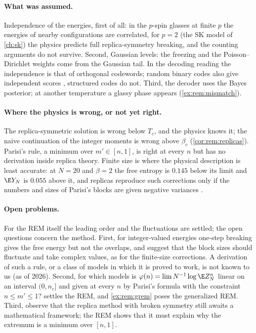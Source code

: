 \begin{refsection}
\paragraph{What was assumed.} Independence of the energies, first of all: in the $p$-spin glasses at finite $p$ the energies of nearby configurations are correlated, for $p=2$ (the SK model of \cref{ch:sk}) the physics predicts full replica-symmetry breaking, and the counting arguments do not survive. Second, Gaussian levels: the freezing and the Poisson--Dirichlet weights come from the Gaussian tail. In the decoding reading the independence is that of orthogonal codewords; random binary codes also give independent scores \parencite[ch.~6]{MezardMontanari2009}, structured codes do not. Third, the decoder uses the Bayes posterior; at another temperature a glassy phase appears (\cref{ex:rem:mismatch}).

\paragraph{Where the physics is wrong, or not yet right.} The replica-symmetric solution is wrong below $T_c$, and the physics knows it; the naive continuation of the integer moments is wrong above $\beta_c$ (\cref{cor:rem:replicas}). Parisi's rule, a minimum over $m'\in[n,1]$, is right at every $n$ but has no derivation inside replica theory. Finite size is where the physical description is least accurate: at $N=20$ and $\beta=2$ the free entropy is $0.145$ below its limit and $\E Y_N$ is $0.055$ above it, and replicas reproduce such corrections only if the numbers and sizes of Parisi's blocks are given negative variances \parencite{DerridaMottishaw2015}.

\paragraph{Open problems.} For the REM itself the leading order and the fluctuations are settled; the open questions concern the method. First, for integer-valued energies one-step breaking gives the free energy but not the overlaps, and \textcite{DerridaMottishaw2022} suggest that the block sizes should fluctuate and take complex values, as for the finite-size corrections. A derivation of such a rule, or a class of models in which it is proved to work, is not known to us (as of 2026). Second, for which models is $\varphi(n)=\lim N^{-1}\log\E Z_N^n$ linear on an interval $(0,n_c]$ and given at every $n$ by Parisi's formula with the constraint $n\le m'\le1$?  settles the REM, and \cref{ex:rem:grem} poses the generalized REM. Third, \textcite[notes to ch.~8]{MezardMontanari2009} observe that the replica method with broken symmetry still awaits a mathematical framework; the REM shows that it must explain why the extremum is a minimum over $[n,1]$.


\end{refsection}

